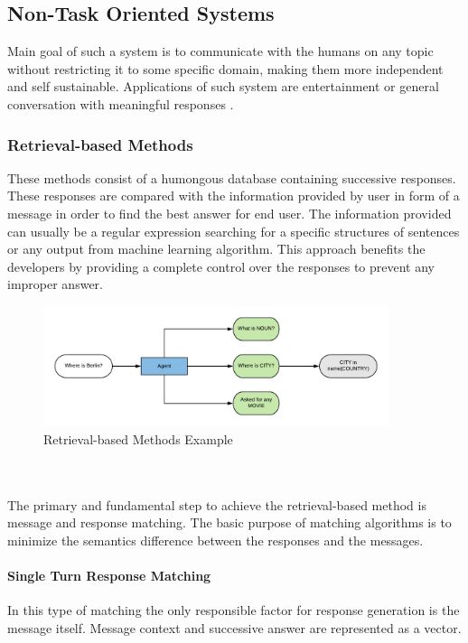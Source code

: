 \subsection{Non-Task Oriented Systems}
Main goal of such a system is to communicate with the humans on any topic without restricting it to some specific domain, making them more independent and self sustainable. Applications of such system are entertainment or general conversation with meaningful responses \cite{surveyondialogsystems}.

\subsubsection*{Retrieval-based Methods}
These methods consist of a humongous database containing successive responses. These responses are compared with the information provided by user in form of a message in order to find the best answer for end user. The information provided can usually be a regular expression searching for a specific structures of sentences or any output from machine learning algorithm. This approach benefits the developers by providing a complete control over the responses to prevent any improper answer. \cite{designandimplementation} 
\begin{figure}[h]
    \centering
    \includegraphics[width=0.9\textwidth]{img/Retrieval_based.pdf}
    \caption{Retrieval-based Methods Example \cite{designandimplementation}}
    \label{fig:rbm}
\end{figure}
\\~\\
The primary and fundamental step to achieve the retrieval-based method is message and response matching. The basic purpose of matching algorithms is to minimize the semantics difference between the responses and the messages. \cite{surveyondialogsystems}

\paragraph*{Single Turn Response Matching}
In this type of matching the only responsible factor for response generation is the message itself. Message context and successive answer are represented as a vector. \cite{surveyondialogsystems}

